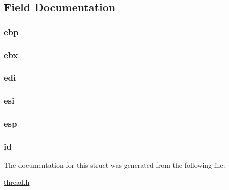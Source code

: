 \subsection{Field Documentation}
\hypertarget{structthread__table_a98b65807686fee47d4061d2f2ea8578a}{
\subsubsection[{ebp}]{ {\bf ebp}}}
\label{structthread__table_a98b65807686fee47d4061d2f2ea8578a}
\hypertarget{structthread__table_aab632bcfbdfeee937cc42940432af39a}{
\subsubsection[{ebx}]{ {\bf ebx}}}
\label{structthread__table_aab632bcfbdfeee937cc42940432af39a}
\hypertarget{structthread__table_ab42cc86f60a286d9cb20116b853239ff}{
\subsubsection[{edi}]{ {\bf edi}}}
\label{structthread__table_ab42cc86f60a286d9cb20116b853239ff}
\hypertarget{structthread__table_a031d176a324992b1ef7c3b7335383590}{
\subsubsection[{esi}]{ {\bf esi}}}
\label{structthread__table_a031d176a324992b1ef7c3b7335383590}
\hypertarget{structthread__table_a7c8cdb0e23278dc958565ee9a5ebb14b}{
\subsubsection[{esp}]{ {\bf esp}}}
\label{structthread__table_a7c8cdb0e23278dc958565ee9a5ebb14b}
\hypertarget{structthread__table_a5b065679595c5c6c708349d563e35b6c}{
\subsubsection[{id}]{ {\bf id}}}
\label{structthread__table_a5b065679595c5c6c708349d563e35b6c}


The documentation for this struct was generated from the following file:\begin{DoxyCompactItemize}
\item 
\hyperlink{thread_8h}{thread.h}\end{DoxyCompactItemize}
